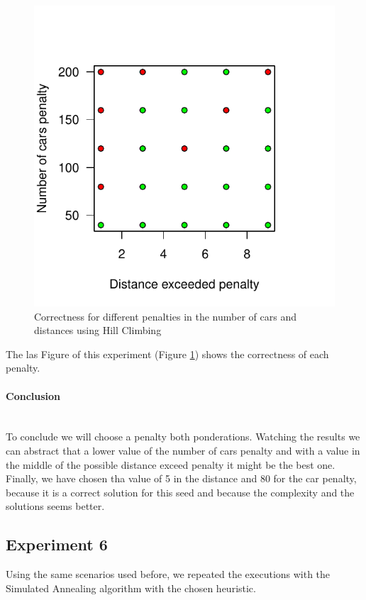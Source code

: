 \documentclass[12]{article}
\begin{document}
\begin{figure}[H]
  \captionsetup{justification=centering}
   \centering
    \includegraphics[scale=0.8]{Results/data_5_4.pdf}
      \caption{Correctness for different penalties in the number of cars and distances using Hill Climbing}
      \label{fig:data_5_4}
  \end{figure}
    \vspace{1cm}

The las Figure of this experiment (Figure \ref{fig:data_5_4}) shows the correctness of each penalty.
    
\paragraph{Conclusion}\mbox{}\\

To conclude we will choose a penalty both ponderations. Watching the results we can abstract that a lower value of the number of cars penalty and with a value in the middle of the possible distance exceed penalty it might be the best one.
Finally, we have chosen tha value of 5 in the distance and 80 for the car penalty, because it is a correct solution for this seed and because the complexity and the solutions seems better.

\subsection{Experiment 6}
Using the same scenarios used before, we repeated the executions with the Simulated Annealing algorithm with the chosen heuristic.
\end{document}
